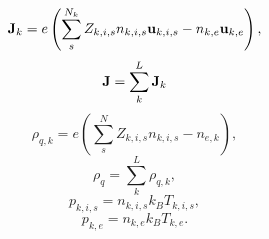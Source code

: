 \documentclass[a4paper,11pt]{report}
\begin{document}
\begin{equation}
    \label{eq:mf_mm_curr_density}
    \mathbf{J}_k = e \left( \sum_s^{N_k} Z_{k,i,s} n_{k,i,s} \mathbf{u}_{k,i,s} - n_{k,e} \mathbf{u}_{k,e} \right),
\end{equation}
\begin{equation}
    \mathbf{J} = \sum_k^L \mathbf{J}_k
\end{equation}
\begin{equation}
    \label{eq:mf_mm_mass_density}
    \rho_{q,k} = e \left( \sum_s^N Z_{k,i,s} n_{k,i,s} - n_{e,k} \right),
\end{equation}
\begin{equation}
    \rho_q = \sum_k^L \rho_{q,k},
\end{equation}
\begin{equation}
    \label{eq:mf_mm_eos_ion}
    p_{k,i,s} = n_{k,i,s} k_B T_{k,i,s},
\end{equation}
\begin{equation}
    \label{eq:mf_mm_eos_elec}
    p_{k,e} = n_{k,e} k_B T_{k,e}.
\end{equation}

\end{document}

